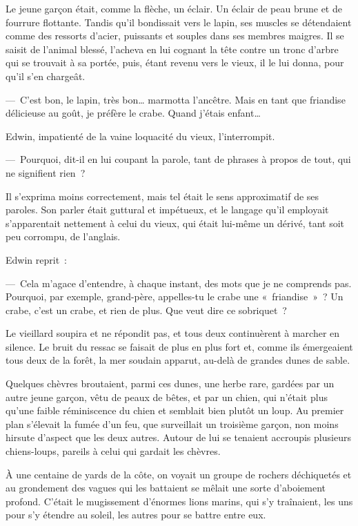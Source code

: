 \documentclass[french,twoside]{book} %
\begin{document}
Le jeune garçon était, comme la flèche, un éclair. Un éclair de peau brune et de fourrure flottante. Tandis qu’il bondissait vers le lapin, ses muscles se détendaient comme des ressorts d’acier, puissants et souples dans ses membres maigres. Il se saisit de l’animal blessé, l’acheva en lui cognant la tête contre un tronc d’arbre qui se trouvait à sa portée, puis, étant revenu vers le vieux, il le lui donna, pour qu’il s’en chargeât.\par
— C’est bon, le lapin, très bon… marmotta l’ancêtre. Mais en tant que friandise délicieuse au goût, je préfère le crabe. Quand j’étais enfant…\par
Edwin, impatienté de la vaine loquacité du vieux, l’interrompit.\par
— Pourquoi, dit-il en lui coupant la parole, tant de phrases à propos de tout, qui ne signifient rien ?\par
Il s’exprima moins correctement, mais tel était le sens approximatif de ses paroles. Son parler était guttural et impétueux, et le langage qu’il employait s’apparentait nettement à celui du vieux, qui était lui-même un dérivé, tant soit peu corrompu, de l’anglais.\par
Edwin reprit :\par
— Cela m’agace d’entendre, à chaque instant, des mots que je ne comprends pas. Pourquoi, par exemple, grand-père, appelles-tu le crabe une « friandise » ? Un crabe, c’est un crabe, et rien de plus. Que veut dire ce sobriquet ?\par
Le vieillard soupira et ne répondit pas, et tous deux continuèrent à marcher en silence. Le bruit du ressac se faisait de plus en plus fort et, comme ils émergeaient tous deux de la forêt, la mer soudain apparut, au-delà de grandes dunes de sable.\par
Quelques chèvres broutaient, parmi ces dunes, une herbe rare, gardées par un autre jeune garçon, vêtu de peaux de bêtes, et par un chien, qui n’était plus qu’une faible réminiscence du chien et semblait bien plutôt un loup. Au premier plan s’élevait la fumée d’un feu, que surveillait un troisième garçon, non moins hirsute d’aspect que les deux autres. Autour de lui se tenaient accroupis plusieurs chiens-loups, pareils à celui qui gardait les chèvres.\par
À une centaine de yards de la côte, on voyait un groupe de rochers déchiquetés et au grondement des vagues qui les battaient se mêlait une sorte d’aboiement profond. C’était le mugissement d’énormes lions marins, qui s’y traînaient, les uns pour s’y étendre au soleil, les autres pour se battre entre eux.\par
\end{document}
